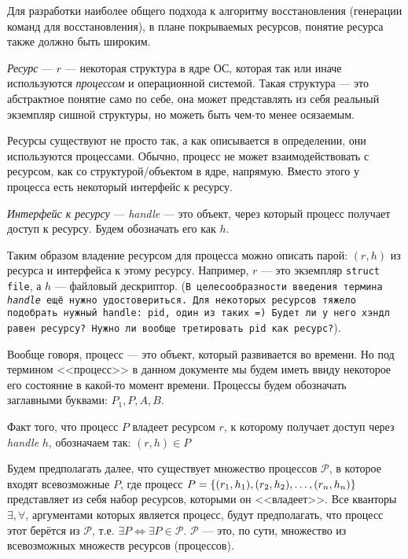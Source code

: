 Для разработки наиболее общего подхода к алгоритму восстановления (генерации команд для восстановления), в плане покрываемых ресурсов, понятие ресурса также должно быть широким.

\begin{defn}
\emph{Ресурс} --- $r$ --- некоторая структура в ядре ОС, которая так или иначе используются \emph{процессом} и операционной системой. 
Такая структура --- это абстрактное понятие само по себе, она может представлять из себя реальный экземпляр сишной структуры, но можеть быть чем-то менее осязаемым.
\end{defn}

Ресурсы существуют не просто так, а как описывается в определении, они используются процессами. Обычно, процесс не может взаимодействовать с ресурсом, как со структурой/объектом в ядре, напрямую. Вместо этого у процесса есть некоторый интерфейс к ресурсу.

\begin{defn}
\emph{Интерфейс к ресурсу} --- \textit{handle} --- это объект, через который процесс получает доступ к ресурсу. Будем обозначать его как $h$.
\end{defn}


Таким образом владение ресурсом для процесса можно описать парой: $(r, h)$ из ресурса и интерфейса к этому ресурсу. Например, $r$ --- это экземпляр \texttt{struct file}, а $h$ --- файловый дескриптор. (\texttt{В целесообразности введения термина \textit{handle} ещё нужно удостовериться. Для некоторых ресурсов тяжело подобрать нужный handle: pid, один из таких =) Будет ли у него хэндл равен ресурсу? Нужно ли вообще третировать pid как ресурс?}).

Вообще говоря, процесс --- это объект, который развивается во времени. Но под термином <<процесс>> в данном документе мы будем иметь ввиду некоторое его состояние в какой-то момент времени.
Процессы будем обозначать заглавными буквами: $P_1, P, A, B$.

Факт того, что процесс $P$ владеет ресурсом $r$, к которому получает доступ через \textit{handle} $h$, обозначаем так: $(r, h) \in P$

Будем предполагать далее, что существует множество процессов $\mathcal{P}$, в которое входят всевозможные $P$, где процесс $P = \left\lbrace (r_1, h_1), (r_2, h_2) , \ldots, (r_n, h_n) \right\rbrace$ представляет из себя набор ресурсов, которыми он <<владеет>>. Все кванторы $\exists, \forall$, аргументами которых является процесс, будут предполагать, что процесс этот берётся из $\mathcal{P}$, т.е. $\exists P \Longleftrightarrow \exists P \in \mathcal{P}$. $\mathcal{P}$ --- это, по сути, множество из всевозможных множеств ресурсов (процессов).

